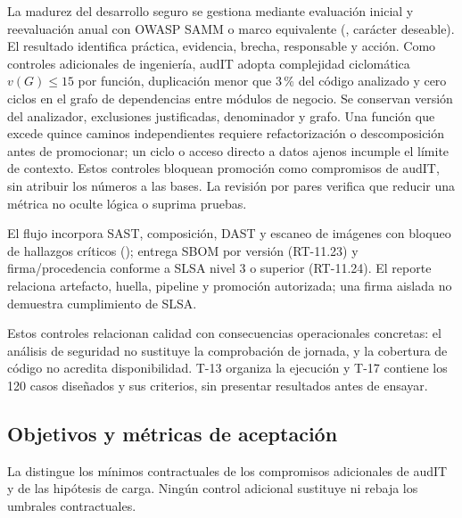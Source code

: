 La madurez del desarrollo seguro se gestiona mediante evaluación inicial y reevaluación anual con OWASP SAMM o marco equivalente (, carácter deseable). El resultado identifica práctica, evidencia, brecha, responsable y acción. Como controles adicionales de ingeniería, audIT adopta complejidad ciclomática $v(G)\le15$ por función, duplicación menor que 3\,\% del código analizado y cero ciclos en el grafo de dependencias entre módulos de negocio. Se conservan versión del analizador, exclusiones justificadas, denominador y grafo. Una función que excede quince caminos independientes requiere refactorización o descomposición antes de promocionar; un ciclo o acceso directo a datos ajenos incumple el límite de contexto. Estos controles bloquean promoción como compromisos de audIT, sin atribuir los números a las bases. La revisión por pares verifica que reducir una métrica no oculte lógica o suprima pruebas.

El flujo incorpora SAST, composición, DAST y escaneo de imágenes con bloqueo de hallazgos críticos (); entrega SBOM por versión (RT-11.23) y firma/procedencia conforme a SLSA nivel 3 o superior (RT-11.24). El reporte relaciona artefacto, huella, pipeline y promoción autorizada; una firma aislada no demuestra cumplimiento de SLSA.

Estos controles relacionan calidad con consecuencias operacionales concretas: el análisis de seguridad no sustituye la comprobación de jornada, y la cobertura de código no acredita disponibilidad. T-13 organiza la ejecución y T-17 contiene los 120 casos diseñados y sus criterios, sin presentar resultados antes de ensayar.

\subsection{Objetivos y métricas de aceptación}\label{sec:9-metricas}

La  distingue los mínimos contractuales de los compromisos adicionales de audIT y de las hipótesis de carga. Ningún control adicional sustituye ni rebaja los umbrales contractuales.

